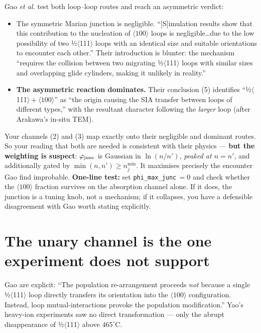 \documentclass[11pt,a4paper]{article}
\newcommand{\code}[1]{\texttt{\small #1}}
\newcommand{\flag}[1]{\textcolor{red!70!black}{#1}}
\begin{document}
Gao \emph{et al.} test both loop--loop routes and reach an asymmetric verdict:

\begin{itemize}[leftmargin=*,itemsep=1pt,topsep=2pt]
\item \flag{The symmetric Marian junction is negligible.} ``[S]imulation results show that
this contribution to the nucleation of $\langle100\rangle$ loops is negligible\ldots due to
the low possibility of two ½$\langle$111$\rangle$ loops with an identical size and suitable
orientations to encounter each other.'' Their introduction is blunter: the mechanism
``requires the collision between two migrating ½$\langle$111$\rangle$ loops with similar
sizes and overlapping glide cylinders, making it unlikely in reality.''
\item \textbf{The asymmetric reaction dominates.} Their conclusion (5) identifies
``½$\langle$111$\rangle+\langle100\rangle$'' as ``the origin causing the SIA transfer
between loops of different types,'' with the resultant character following the
\emph{larger} loop (after Arakawa's in-situ TEM).
\end{itemize}

Your channels (2) and (3) map exactly onto their negligible and dominant routes. So your
reading that both are needed is consistent with their physics --- \textbf{but the weighting
is suspect}: $\varphi_{\rm junc}$ is Gaussian in $\ln(n/n')$, \emph{peaked at $n=n'$}, and
additionally gated by $\min(n,n')\ge n_j^{\min}$. It maximises precisely the encounter Gao
find improbable. \textbf{One-line test:} set \code{phi\_max\_junc}$\,=0$ and check whether the
$\langle100\rangle$ fraction survives on the absorption channel alone. If it does, the
junction is a tuning knob, not a mechanism; if it collapses, you have a defensible
disagreement with Gao worth stating explicitly.

\section{The unary channel is the one experiment does not support}

Gao are explicit: ``The population re-arrangement proceeds \emph{not} because a single
½$\langle$111$\rangle$ loop directly transfers its orientation into the $\langle100\rangle$
configuration. Instead, loop mutual-interactions provoke the population modification.''
Yao's heavy-ion experiments saw no direct transformation --- only the abrupt disappearance
of ½$\langle$111$\rangle$ above $465^\circ$C.
\end{document}
